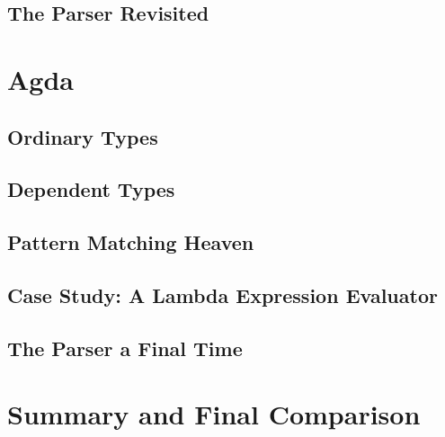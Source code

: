 \documentclass[11pt]{article}
\begin{document}
\subsection{The Parser Revisited}

\section{Agda}

\subsection{Ordinary Types}

\subsection{Dependent Types}

\subsection{Pattern Matching Heaven}

\subsection{Case Study: A Lambda Expression Evaluator}

\subsection{The Parser a Final Time}

\section{Summary and Final Comparison}
\end{document}
